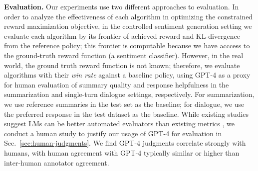 \textbf{Evaluation.} Our experiments use two different approaches to evaluation. In order to analyze the effectiveness of each algorithm in optimizing the constrained reward maximization objective, in the controlled sentiment generation setting we evaluate each algorithm by its frontier of achieved reward and KL-divergence from the reference policy; this frontier is computable because we have acccess to the ground-truth reward function (a sentiment classifier). However, in the real world, the ground truth reward function is not known; therefore, we evaluate algorithms with their \textit{win rate} against a baseline policy, using GPT-4 as a proxy for human evaluation of summary quality and response helpfulness in the summarization and single-turn dialogue settings, respectively. For summarization, we use reference summaries in the test set as the baseline; for dialogue, we use the preferred response in the test dataset as the baseline. While existing studies suggest LMs can be better automated evaluators than existing metrics \citep{Chen2023ExploringTU}, we conduct a human study to justify our usage of GPT-4 for evaluation in Sec.~\ref{sec:human-judgments}. We find GPT-4 judgments correlate strongly with humans, with human agreement with GPT-4 typically similar or higher than inter-human annotator agreement. 



